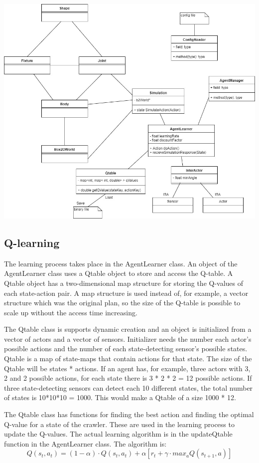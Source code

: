 \documentclass{article}
\begin{document}
\includegraphics[width=1\textwidth]{c++UML}

\subsection{Q-learning}
The learning process takes place in the AgentLearner class.
An object of the AgentLearner
class uses a Qtable object to store and access the Q-table. A Qtable object
has a two-dimensional map structure for storing the Q-values of each
state-action pair. A map structure is used instead of, for example,
a vector structure which was the original plan, so the size of
the Q-table is possible to scale up without the access time increasing.

The Qtable class is supports dynamic creation and an object is initialized
from a vector of actors and a vector of sensors. Initializer needs
the number each actor's possible actions and the number of each
state-detecting sensor's possible states. Qtable is a map of
state-maps that contain actions for that state. The size of the Qtable
will be states * actions. If an agent has, for example, three actors
with 3, 2 and 2 possible actions, for each state there is
3 * 2 * 2 = 12 possible actions. If three state-detecting sensors can
detect each 10 different states, the total number of states is
10*10*10 = 1000. This would make a Qtable of a size 1000 * 12.

The Qtable class has functions for finding the best action and finding
the optimal Q-value for a state of the crawler. These are used in the
learning process to update the Q-values. The actual learning algorithm
is in the updateQtable function in the AgentLearner class. The algorithm
is:
\[Q(s_t, a_t) = (1 - \alpha) \cdot Q(s_t, a_t) + \alpha
[ r_t + \gamma \cdot max_aQ(s_{t+1}, a)]\]
\end{document}
